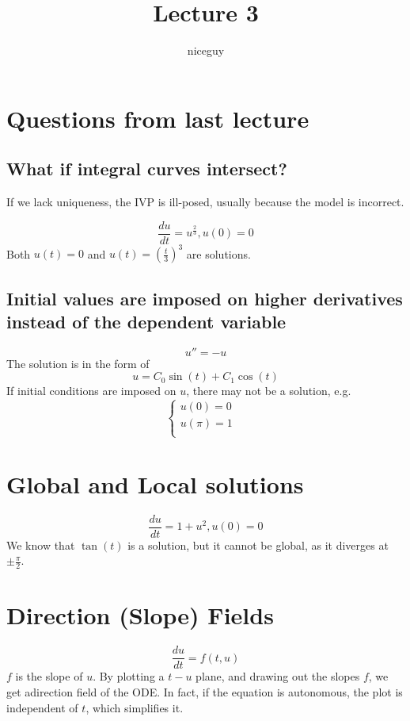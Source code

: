 \documentclass[12pt]{article}
\title{Lecture 3}
\author{niceguy}
\begin{document}
\maketitle
\section{Questions from last lecture}

\subsection{What if integral curves intersect?}

If we lack uniqueness, the IVP is ill-posed, usually because the model is incorrect.

\begin{ex}
$$\frac{du}{dt} = u^{\frac{2}{3}}, u(0) = 0$$
Both $u(t) = 0$ and $u(t) = \left(\frac{t}{3}\right)^3$ are solutions.
\end{ex}

\subsection{Initial values are imposed on higher derivatives instead of the dependent variable}

$$u'' = -u$$
The solution is in the form of
$$u = C_0\sin(t) + C_1\cos(t)$$
If initial conditions are imposed on $u$, there may not be a solution, e.g.
$$\begin{cases} u(0) = 0 & \\ u(\pi) = 1 & \\ \end{cases}$$

\section{Global and Local solutions}

\begin{ex}
$$\frac{du}{dt} = 1 + u^2, u(0) = 0$$
We know that $\tan(t)$ is a solution, but it cannot be global, as it diverges at $\pm \frac{\pi}{2}$.
\end{ex}

\section{Direction (Slope) Fields}
$$\frac{du}{dt} = f(t,u)$$
$f$ is the slope of $u$. By plotting a $t-u$ plane, and drawing out the slopes $f$, we get adirection field of the ODE. In fact, if the equation is autonomous, the plot is independent of $t$, which simplifies it.
\end{document}
